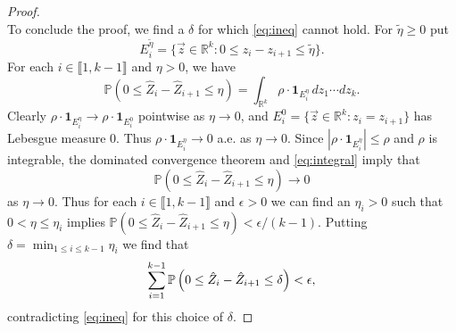 \begin{proof}
\begin{equation}
	\end{equation}
	To conclude the proof, we find a $\delta$ for which \eqref{eq:ineq} cannot hold. For $\tilde\eta\geq 0$ put
	\[
	E_i^{\tilde\eta} = \{\vec{z} \in\mathbb{R}^k : 0 \leq z_i-z_{i+1}\leq\tilde\eta\}.
	\] 
	For each $i\in\llbracket 1, k-1\rrbracket$ and $\eta > 0$, we have
	\begin{equation}\label{eq:integral}
	\mathbb{P}\left(0 \leq \hat{Z}_i - \hat{Z}_{i+1} \leq \eta\right) = \int_{\mathbb{R}^k} \rho\cdot\mathbf{1}_{E_i^\eta}\,dz_1\cdots dz_k.
	\end{equation}
	Clearly $\rho \cdot \mathbf{1}_{E_i^\eta} \to \rho \cdot \mathbf{1}_{E_i^0}$ pointwise as $\eta \to 0$, and $E_i^0 = \{\vec{z} \in\mathbb{R}^k : z_i = z_{i+1}\}$ has Lebesgue measure 0. Thus $\rho\cdot\mathbf{1}_{E_i^\eta} \to 0$ a.e. as $\eta\to 0$. Since $|\rho\cdot\mathbf{1}_{E_i^\eta}| \leq \rho$ and $\rho$ is integrable, the dominated convergence theorem \cite[Theorem 1.34]{RudinRCA} and \eqref{eq:integral} imply that
	\begin{equation*}
	\mathbb{P}\left(0 \leq \hat{Z}_i - \hat{Z}_{i+1} \leq \eta\right) \longrightarrow  0
	\end{equation*}
	as $\eta\to 0$.	Thus for each $i\in\llbracket 1,k-1\rrbracket$ and $\epsilon > 0$ we can find an $\eta_i > 0$ such that $0<\eta \leq \eta_i$ implies $\mathbb{P}(0 \leq \hat{Z}_i - \hat{Z}_{i+1} \leq \eta)<\epsilon/(k-1)$. Putting $\delta=\min_{1\leq i\leq k-1}\eta_i$ we find that 
	\begin{equation*}
	\sum_{i=1}^{k-1}\mathbb{P}\left( 0 \leq \hat Z_i-\hat Z_{i+1}\leq\delta \right) < \epsilon,
	\end{equation*}
	contradicting \eqref{eq:ineq} for this choice of $\delta$.
	
\end{proof}
